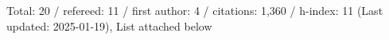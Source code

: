 Total: 20 / refereed: 11 / first author: 4 / citations: 1,360 / h-index: 11 (Last updated: 2025-01-19), List attached below